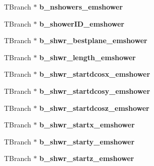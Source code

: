 \begin{DoxyCompactItemize}
\item 
\hypertarget{classanatree_a3ea35b914b9a6a2ccdfdab81dcf12c67}{T\-Branch $\ast$ {\bfseries b\-\_\-nshowers\-\_\-emshower}}\label{classanatree_a3ea35b914b9a6a2ccdfdab81dcf12c67}

\item 
\hypertarget{classanatree_a77b3777c94e70442c12270e7045e76e4}{T\-Branch $\ast$ {\bfseries b\-\_\-shower\-I\-D\-\_\-emshower}}\label{classanatree_a77b3777c94e70442c12270e7045e76e4}

\item 
\hypertarget{classanatree_af213943a244b6f731b213cd36abbb195}{T\-Branch $\ast$ {\bfseries b\-\_\-shwr\-\_\-bestplane\-\_\-emshower}}\label{classanatree_af213943a244b6f731b213cd36abbb195}

\item 
\hypertarget{classanatree_a93216be71fcdf8493a2ae993480ec3ab}{T\-Branch $\ast$ {\bfseries b\-\_\-shwr\-\_\-length\-\_\-emshower}}\label{classanatree_a93216be71fcdf8493a2ae993480ec3ab}

\item 
\hypertarget{classanatree_add9e4238d8e87385ce64f1e198245c53}{T\-Branch $\ast$ {\bfseries b\-\_\-shwr\-\_\-startdcosx\-\_\-emshower}}\label{classanatree_add9e4238d8e87385ce64f1e198245c53}

\item 
\hypertarget{classanatree_ab78dad7cb33a332bf20454f996f5b313}{T\-Branch $\ast$ {\bfseries b\-\_\-shwr\-\_\-startdcosy\-\_\-emshower}}\label{classanatree_ab78dad7cb33a332bf20454f996f5b313}

\item 
\hypertarget{classanatree_a737d92ea209d6781ad2e19c0226fb812}{T\-Branch $\ast$ {\bfseries b\-\_\-shwr\-\_\-startdcosz\-\_\-emshower}}\label{classanatree_a737d92ea209d6781ad2e19c0226fb812}

\item 
\hypertarget{classanatree_a6a4a697380f1cf7e86523b1a95fffdb9}{T\-Branch $\ast$ {\bfseries b\-\_\-shwr\-\_\-startx\-\_\-emshower}}\label{classanatree_a6a4a697380f1cf7e86523b1a95fffdb9}

\item 
\hypertarget{classanatree_a355fe52b10b8524f8a73a5911e3b2b1d}{T\-Branch $\ast$ {\bfseries b\-\_\-shwr\-\_\-starty\-\_\-emshower}}\label{classanatree_a355fe52b10b8524f8a73a5911e3b2b1d}

\item 
\hypertarget{classanatree_a9fbab35e3e5a399899623a72a1f46d60}{T\-Branch $\ast$ {\bfseries b\-\_\-shwr\-\_\-startz\-\_\-emshower}}\label{classanatree_a9fbab35e3e5a399899623a72a1f46d60}


\end{DoxyCompactItemize}
